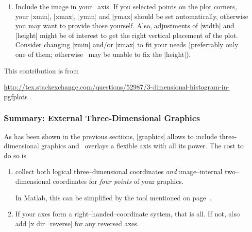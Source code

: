 {{\begin{enumerate}
\begin{codeexample}[code only]
currentScreenUnits=get(gcf,'Units')     %
currentPaperUnits=get(gcf,'PaperUnits') %
set(gcf,'Units',currentPaperUnits)      %
plotPosition=get(gcf,'Position')        %
set(gcf,'PaperSize',plotPosition(3:4))  %
set(gcf,'Units',currentScreenUnits)     %

print -dpdf matlabout      %
\end{codeexample}
\item Include the image in your \PGFPlots\ axis. If you selected points on the plot corners, your |xmin|, |xmax|, |ymin| and |ymax| should be set automatically, otherwise you may want to provide those yourself. Also, adjustments of |width| and |height| might be of interest to get the right vertical placement of the plot. Consider changing |zmin| and/or |zmax| to fit your needs (preferrably only one of them; otherwise \PGFPlots\ may be unable to fix the |height|).
\end{enumerate}

This contribution is from

\noindent
\url{http://tex.stackexchange.com/questions/52987/3-dimensional-histogram-in-pgfplots} .



\subsubsection*{Summary: External Three-Dimensional Graphics}
As has been shown in the previous sections,  |graphics| allows to include three-dimensional graphics and \PGFPlots\ overlays a flexible axis with all its power. The cost to do so is
\begin{enumerate}
	\item collect both logical three--dimensional coordinates \emph{and} image--internal two--dimensional coordinates for \emph{four points} of your graphics.

	In Matlab, this can be simplified by the tool mentioned on page~\pageref{sec:plotgraphics3d:matlabscript}.

	\item If your axes form a right--handed--coordinate system, that is all. If not, also add |x dir=reverse| for any reversed axes.
\end{enumerate}

}}
